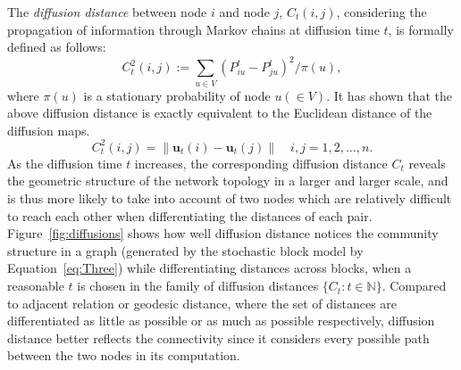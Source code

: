 \documentclass[11pt]{article}
\theoremstyle{definition}
\begin{document}
	The \textit{diffusion distance} between node $i$ and node $j$, $C_{t}(i,j)$, considering the propagation of information through Markov chains at diffusion time $t$, is formally defined as follows:
	\begin{equation}
	\label{eq:distance}
	C^2_{t}(i,j) := \sum\limits_{u \in V} \left( P^{t}_{iu} - P^{t}_{ju}  \right)^2 /  \pi(u),
	\end{equation}
	where $\pi(u)$ is a stationary probability of node $u (\in V)$. 
	It has shown that the above diffusion distance is exactly equivalent to the Euclidean distance of the diffusion maps. 
	\begin{equation}
	\label{eq:diffusion}
	C^2_{t}(i,j)  =   \parallel \mathbf{u}_{t}(i) - \mathbf{u}_{t}(j) \parallel   \quad i,j = 1,2, \ldots , n.
	\end{equation}
	As the diffusion time $t$ increases, the corresponding diffusion distance $C_{t}$ reveals the geometric structure of the network topology in a larger and larger scale, and is thus more likely to take into account of two nodes which are relatively difficult to reach each other when differentiating the distances of each pair. Figure~\ref{fig:diffusions} shows how well diffusion distance notices the community structure in a graph (generated by the stochastic block model by Equation~\ref{eq:Three}) while differentiating distances across blocks, when a reasonable $t$ is chosen in the family of diffusion distances $\{ C_{t} : t \in \mathbb{N} \}$. Compared to adjacent relation or geodesic distance, where the set of distances are differentiated as little as possible or as much as possible respectively, diffusion distance better reflects the connectivity since it considers every possible path between the two nodes in its computation. 
	
\end{document}
